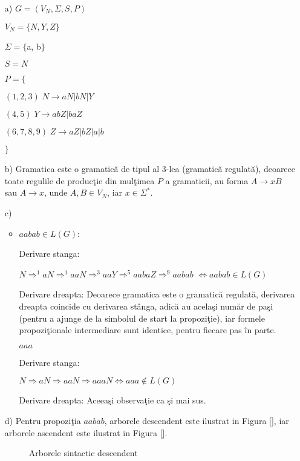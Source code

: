 \begin{enumerate}
\begin{enumerate}
\item[a)]
$G = (V_{N}, \Sigma, S, P)$

$V_{N}= \{N, Y, Z\}$

$\Sigma = \{$a, b$\} $ 

$S = N$

$P=\{$

$(1,2,3) \; N \rightarrow a N | b N | Y$

$(4,5) \; Y \rightarrow ab Z | ba Z$

$(6,7,8,9) \; Z \rightarrow aZ | bZ | a | b$

$\}$

\item[b)]
Gramatica este o gramatică de tipul al 3-lea (gramatică regulată), deoarece toate regulile de producţie din mulţimea $P$ a gramaticii, au forma $A \rightarrow x B$ sau $A \rightarrow x$, unde $A,B \in V_N$, iar $x \in \Sigma^*$.

\item[c)]
\begin{itemize}
\item
$aabab \in L(G)$:

Derivare stanga:

$N \Rightarrow^1 a N \Rightarrow^1 a a N \Rightarrow^3 a a Y \Rightarrow^5 a a ba Z \Rightarrow^9 a a ba b$ $\Leftrightarrow aabab \in L(G)$

Derivare dreapta: Deoarece gramatica este o gramatică regulată, derivarea dreapta coincide cu derivarea stânga, adică au acelaşi număr de paşi (pentru a ajunge de la simbolul de start la propoziţie), iar formele propoziţionale intermediare sunt identice, pentru fiecare pas în parte.

$aaa$

Derivare stanga:

$N \Rightarrow a N \Rightarrow a a N \Rightarrow a a a N \Leftrightarrow aaa \notin L(G)$

Derivare dreapta: Aceeaşi observaţie ca şi mai sus.

\end{itemize}

\item[d)]
Pentru propoziţia $aabab$, arborele descendent este ilustrat in Figura \ref{}, iar arborele ascendent este ilustrat in Figura \ref{}.

\begin{figure}[H]
\caption{Arborele sintactic descendent}
\end{figure}


\end{enumerate}
\end{enumerate}
